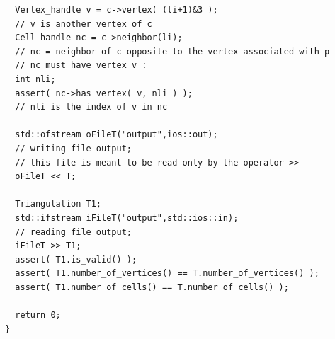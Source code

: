 \begin{verbatim}
  Vertex_handle v = c->vertex( (li+1)&3 );
  // v is another vertex of c
  Cell_handle nc = c->neighbor(li);
  // nc = neighbor of c opposite to the vertex associated with p
  // nc must have vertex v :
  int nli;
  assert( nc->has_vertex( v, nli ) );
  // nli is the index of v in nc

  std::ofstream oFileT("output",ios::out);
  // writing file output; 
  // this file is meant to be read only by the operator >>
  oFileT << T; 

  Triangulation T1;
  std::ifstream iFileT("output",std::ios::in);
  // reading file output; 
  iFileT >> T1; 
  assert( T1.is_valid() );
  assert( T1.number_of_vertices() == T.number_of_vertices() );
  assert( T1.number_of_cells() == T.number_of_cells() );

  return 0;
}
\end{verbatim}

